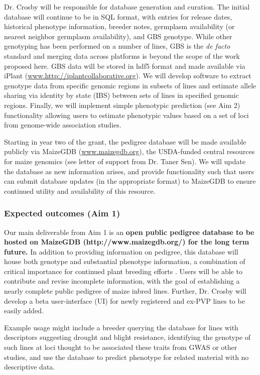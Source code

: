 \documentclass[12pt]{article}
\begin{document}
Dr. Crosby will be responsible for database generation and curation.
The initial database will continue to be in SQL format, with entries for release dates, historical phenotype information, breeder notes, germplasm availability (or nearest neighbor germplasm availability), and GBS genotype.  
While other genotyping has been performed on a number of lines, GBS is the \emph{de facto} standard \citep{romay2013comprehensive} and merging data across platforms is beyond the scope of the work proposed here. 
GBS data will be stored in hdf5 format and made available via iPlant (\url{www.http://iplantcollaborative.org}).
We will develop software to extract genotype data from specific genomic regions in subsets of lines and estimate allele sharing via identity by state (IBS) between sets of lines in specified genomic regions.
Finally, we will implement simple phenotypic prediction (see Aim 2) functionality allowing users to estimate phenotypic values based on a set of loci from genome-wide association studies.

Starting in year two of the grant, the pedigree database will be made available publicly via MaizeGDB (\url{www.maizegdb.org}), the USDA-funded central resources for maize genomics (see letter of support from Dr. Taner Sen).
We will update the database as new information arises, and provide functionality such that users can submit database updates (in the appropriate format) to MaizeGDB to ensure continued utility and availability of this resource.

\subsubsection*{Expected outcomes (Aim 1)}
Our main deliverable from Aim 1 is an \textbf{open public pedigree database to be hosted on MaizeGDB (http://www.maizegdb.org/) for the long term future.} 
In addition to providing information on pedigree, this database will house both genotype and substantial phenotype information, a combination of critical importance for continued plant breeding efforts \citep{zamir2013have}.
Users will be able to contribute and revise incomplete information, with the goal of establishing a nearly complete public pedigree of maize inbred lines. Further, Dr. Crosby will develop a beta user-interface (UI) for newly registered and ex-PVP lines to be easily added.   

Example usage might include a breeder querying the database for lines with descriptors suggesting drought and blight resistance, identifying the genotype of such lines at loci thought to be associated these traits from GWAS or other studies, and use the database to predict phenotype for related material with no descriptive data.
\end{document}
